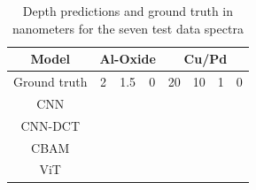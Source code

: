 \begin{table}[H]
    \centering
    \begin{tabular}{c|c|c|c|c|c|c|c}
        Model  &    \multicolumn{3}{|c|}{Al-Oxide}     & \multicolumn{4}{c}{Cu/Pd}            \\
        \hline
Ground truth   &       2   &   1.5   &  0   & 20   & 10    & 1     & 0                               \\
\hline
  CNN          &           &        &       &      &       &       &                                     \\
CNN-DCT        &           &        &       &      &       &       &                                     \\
CBAM           &           &        &       &      &       &       &                                     \\
ViT            &           &        &       &      &       &       &                                     \\

    \end{tabular}
    \caption{Depth predictions and ground truth in nanometers for the seven test data spectra}
    \label{tab:acc_depth}
\end{table}
